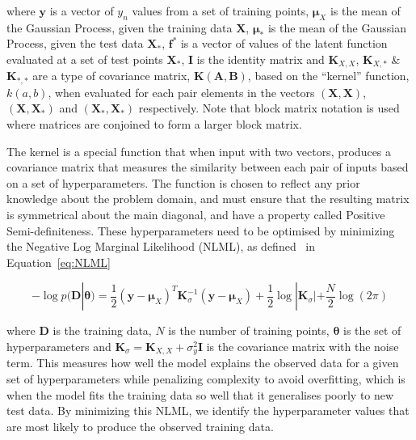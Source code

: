 \documentclass[12pt]{article}
\begin{document}
    \noindent where $\mathbf{y}$ is a vector of $y_n$ values from a set of training points, $\boldsymbol{\mu}_X$ is the mean of the Gaussian Process, given the training data $\mathbf{X}$, $\boldsymbol{\mu}_*$ is the mean of the Gaussian Process, given the test data $\mathbf{X}_*$, $\mathbf{f}^*$ is a vector of values of the latent function evaluated at a set of test points $\mathbf{X}_*$, $\mathbf{I}$ is the identity matrix and $\mathbf{K}_{X,X}$, $\mathbf{K}_{X,*}$ \& $\mathbf{K}_{*,*}$ are a type of covariance matrix, $\mathbf{K}(\mathbf{A},\mathbf{B})$, based on the ``kernel'' function, $k(a,b)$, when evaluated for each pair elements in the vectors $(\mathbf{X},\mathbf{X})$, $(\mathbf{X},\mathbf{X}_*)$ and $(\mathbf{X}_*,\mathbf{X}_*)$ respectively.
    Note that block matrix notation is used where matrices are conjoined to form a larger block matrix. 

    The kernel is a special function that when input with two vectors, produces a covariance matrix that measures the similarity between each pair of inputs based on a set of hyperparameters.
    The function is chosen to reflect any prior knowledge about the problem domain, and must ensure that the resulting matrix is symmetrical about the main diagonal, and have a property called Positive Semi-definiteness.
    These hyperparameters need to be optimised by minimizing the Negative Log Marginal Likelihood (NLML), as defined~\cite{murphy2023probabilistic} in Equation~\ref{eq:NLML}

    \begin{equation}
        -\log p(\mathbf{D}|\boldsymbol{\theta}) = \frac{1}{2} (\mathbf{y} - \boldsymbol{\mu}_X)^T \mathbf{K}_{\sigma}^{-1} (\mathbf{y} - \boldsymbol{\mu}_X) + \frac{1}{2} \log |\mathbf{K}_{\sigma}| + \frac{N}{2} \log(2\pi)\label{eq:NLML}
    \end{equation}


    \noindent where $\mathbf{D}$ is the training data, $N$ is the number of training points, $\boldsymbol{\theta}$ is the set of hyperparameters and $\mathbf{K}_{\sigma} = \mathbf{K}_{X,X} + \sigma^2_y \mathbf{I}$ is the covariance matrix with the noise term.
    This measures how well the model explains the observed data for a given set of hyperparameters while penalizing complexity to avoid overfitting, which is when the model fits the training data so well that it generalises poorly to new test data.
    By minimizing this NLML, we identify the hyperparameter values that are most likely to produce the observed training data.
\end{document}
